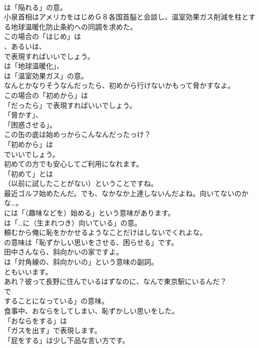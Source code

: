 \documentclass[8pt]{extreport}
\begin{document}
\begin{CJK}{UTF8}{min}
\\	は「陥れる」の意。	
\\	小泉首相はアメリカをはじめＧ８各国首脳と会談し、温室効果ガス削減を柱とする地球温暖化防止条約への同調を求めた。 
\\	この場合の「はじめ」は 
\\	、あるいは、
\\	で表現すればいいでしょう。
\\	は「地球温暖化」、
\\	は「温室効果ガス」の意。	
\\	なんとかなりそうなんだったら、初めから行けないかもって脅かすなよ。 
\\	この場合の「初めから」は
\\	「だったら」で表現すればいいでしょう。
\\	「脅かす」、
\\	「困惑させる」。	
\\	この缶の底は始めっからこんなんだったっけ？ 
\\	「初めから」は
\\	でいいでしょう。	
\\	初めての方でも安心してご利用になれます。 
\\	「初めて」とは
\\	（以前に試したことがない）ということですね。	
\\	最近ゴルフ始めたんだ。でも、なかなか上達しないんだよね。向いてないのかな…。 
\\	には「（趣味などを）始める」という意味があります。
\\	は「…に（生まれつき）向いている」の意。	
\\	頼むから俺に恥をかかせるようなことだけはしないでくれよな。 
\\	の意味は「恥ずかしい思いをさせる、困らせる」です。	
\\	田中さんなら、斜向かいの家ですよ。 
\\	は「対角線の、斜向かいの」という意味の副詞。
\\	ともいいます。	
\\	あれ？彼って長野に住んでいるはずなのに、なんで東京駅にいるんだ？ 
\\	で
\\	することになっている」の意味。	
\\	食事中、おならをしてしまい、恥ずかしい思いをした。 
\\	「おならをする」は
\\	「ガスを出す」で表現します。
\\	「屁をする」は少し下品な言い方です。	

\end{CJK}
\end{document}
